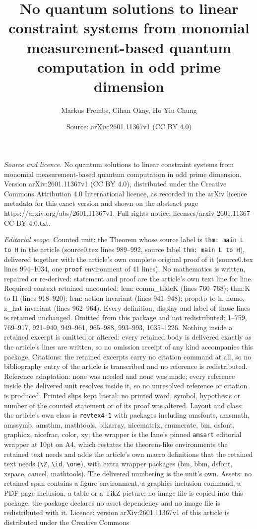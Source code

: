 \documentclass[10pt,a4paper]{amsart}
\title[No quantum solutions to linear constraint systems from monom]{No quantum solutions to linear constraint systems from monomial measurement-based quantum computation in odd prime dimension}
\author{Markus Frembs, Cihan Okay, Ho Yiu Chung}
\date{Source: arXiv:2601.11367v1 (CC BY 4.0)}
\begin{document}
\maketitle

\noindent\emph{Source and licence.} No quantum solutions to linear constraint systems from monomial measurement-based quantum computation in odd prime dimension. Version arXiv:2601.11367v1 (CC BY 4.0), distributed under the Creative Commons Attribution 4.0 International licence, as recorded in the arXiv licence metadata for this exact version and shown on the abstract page https://arxiv.org/abs/2601.11367v1. Full rights notice: licenses/arxiv-2601.11367-CC-BY-4.0.txt.\par\smallskip

\noindent\textit{Editorial scope.} Counted unit: the Theorem whose source label is \texttt{thm: main L to H} in the article (source0.tex lines 989--992, source label \texttt{thm: main L to H}), delivered together with the article's own complete original proof of it (source0.tex lines 994--1034, one \texttt{proof} environment of 41 lines). No mathematics is written, repaired or re-derived: statement and proof are the article's own text line for line. Required context retained uncounted: lem: comm\_tildeK (lines 760--768); thm:K to H (lines 918--920); lem: action invariant (lines 941--948); prop:tp to h, homo, z\_hat invariant (lines 962--964). Every definition, display and label of those lines is retained unchanged. Omitted from this package and not redistributed: 1--759, 769--917, 921--940, 949--961, 965--988, 993--993, 1035--1226. Nothing inside a retained excerpt is omitted or altered: every retained body is delivered exactly as the article's lines are written, so no omission receipt of any kind accompanies this package. Citations: the retained excerpts carry no citation command at all, so no bibliography entry of the article is transcribed and no reference is redistributed. Reference adaptation: none was needed and none was made; every reference inside the delivered unit resolves inside it, so no unresolved reference or citation is produced. Printed slips kept literal: no printed word, symbol, hypothesis or number of the counted statement or of its proof was altered. Layout and class: the article's own class is \texttt{revtex4-1} with packages including amsfonts, amsmath, amssymb, amsthm, mathtools, blkarray, nicematrix, enumerate, bm, dsfont, graphicx, nicefrac, color, xy; the wrapper is the lane's pinned \texttt{amsart} editorial wrapper at 10pt on A4, which restates the theorem-like environments the retained text needs and adds the article's own macro definitions that the retained text needs (\texttt{\textbackslash Z}, \texttt{\textbackslash id}, \texttt{\textbackslash one}), with extra wrapper packages (bm, bbm, dsfont, xspace, cancel, mathtools). The delivered numbering is the unit's own. Assets: no retained span contains a figure environment, a graphics-inclusion command, a PDF-page inclusion, a table or a TikZ picture; no image file is copied into this package, the package declares no asset dependency and no image file is redistributed with it. Licence: version arXiv:2601.11367v1 of this article is distributed under the Creative Commons 
\end{document}
